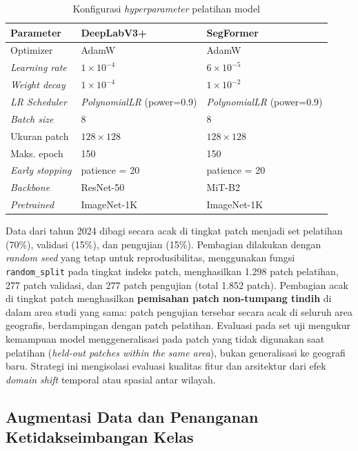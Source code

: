 \begin{table}[htbp]
\centering
\caption{Konfigurasi \textit{hyperparameter} pelatihan model}
\label{tab:hyperparams}
\begin{tabular}{lll}
\hline
\textbf{Parameter} & \textbf{DeepLabV3+} & \textbf{SegFormer} \\
\hline
Optimizer          & AdamW               & AdamW \\
\textit{Learning rate} & $1 \times 10^{-4}$ & $6 \times 10^{-5}$ \\
\textit{Weight decay}  & $1 \times 10^{-4}$ & $1 \times 10^{-2}$ \\
\textit{LR Scheduler}  & \textit{PolynomialLR} (power=0.9) & \textit{PolynomialLR} (power=0.9) \\
\textit{Batch size}    & 8                  & 8 \\
Ukuran patch       & $128\times128$      & $128\times128$ \\
Maks. epoch        & 150                 & 150 \\
\textit{Early stopping} & patience = 20   & patience = 20 \\
\textit{Backbone}      & ResNet-50          & MiT-B2 \\
\textit{Pretrained}    & ImageNet-1K        & ImageNet-1K \\
\hline
\end{tabular}
\end{table}

Data dari tahun 2024 dibagi secara acak di tingkat patch menjadi set pelatihan (70\%), validasi (15\%), dan pengujian (15\%).
\label{subsec:data_split}
Pembagian dilakukan dengan \textit{random seed} yang tetap untuk reprodusibilitas, menggunakan fungsi \texttt{random\_split} pada tingkat indeks patch, menghasilkan 1.298 patch pelatihan, 277 patch validasi, dan 277 patch pengujian (total 1.852 patch).
Pembagian acak di tingkat patch menghasilkan \textbf{pemisahan patch non-tumpang tindih} di dalam area studi yang sama: patch pengujian tersebar secara acak di seluruh area geografis, berdampingan dengan patch pelatihan.
Evaluasi pada set uji mengukur kemampuan model menggeneralisasi pada patch yang tidak digunakan saat pelatihan (\textit{held-out patches within the same area}), bukan generalisasi ke geografi baru.
Strategi ini mengisolasi evaluasi kualitas fitur dan arsitektur dari efek \textit{domain shift} temporal atau spasial antar wilayah.

\subsection{Augmentasi Data dan Penanganan Ketidakseimbangan Kelas}

